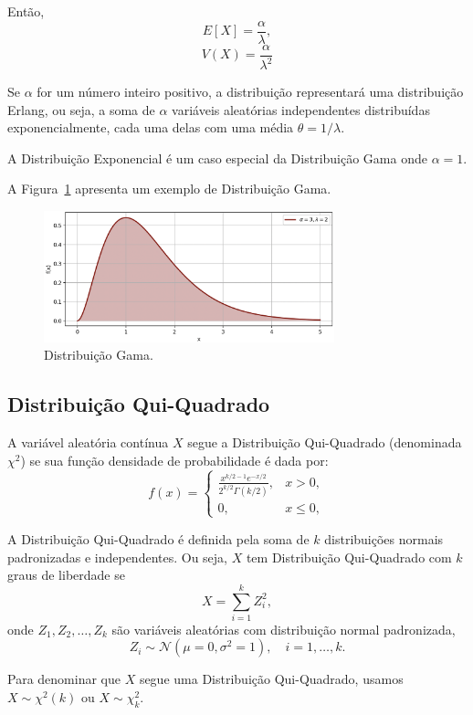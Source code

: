 \documentclass{article}
\begin{document}
Então,
    $$
    E[X] = \frac{\alpha}{\lambda},
    $$
    $$
    V(X) = \frac{\alpha}{\lambda^2}
    $$

Se $\alpha$ for um número inteiro positivo, a distribuição representará uma distribuição Erlang, ou seja, a soma de $\alpha$ variáveis aleatórias independentes distribuídas exponencialmente, cada uma delas com uma média $\theta = 1/\lambda$.

A Distribuição Exponencial é um caso especial da Distribuição Gama onde $\alpha = 1$.

A Figura~\ref{fig:dist_cont_gama} apresenta um exemplo de Distribuição Gama.

\begin{figure}[H]
    \centering    \includegraphics[width=0.75\textwidth]{figuras/dist_cont_gama.png}
    \caption{Distribuição Gama.}
    \label{fig:dist_cont_gama}
\end{figure}

\subsection{Distribuição Qui-Quadrado}
A variável aleatória contínua $X$ segue a Distribuição Qui-Quadrado (denominada $\chi^2$) se sua função densidade de probabilidade é dada por:
    $$
    f(x) = 
    \begin{cases}
    \frac{x^{k/2 - 1} e^{-x/2}}{2^{k/2} \Gamma(k/2)}, & x > 0, \\
    0, & x \leq 0,
    \end{cases}
    $$

A Distribuição Qui-Quadrado é definida pela soma de $k$ distribuições normais padronizadas e independentes. Ou seja, $X$ tem Distribuição Qui-Quadrado com $k$ graus de liberdade se
    $$
    X = \sum_{i=1}^{k} Z_i^2,
    $$
onde $Z_1, Z_2, \ldots, Z_k$ são variáveis aleatórias com distribuição normal padronizada,
    $$
    Z_i \sim \mathcal{N}(\mu = 0, \sigma^2 = 1), \quad i = 1, \ldots, k.
    $$

Para denominar que $X$ segue uma Distribuição Qui-Quadrado, usamos $X \sim \chi^2(k)$ ou $X \sim \chi_k^2$.
\end{document}
